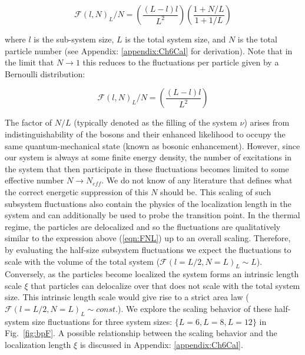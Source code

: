 \begin{equation}
\label{eqn:FNL}
\mathcal{F}(l,N)_L/N = \left ( \frac{\left ( L-l \right ) l }{L^2} \right ) \left ( \frac{ 1+N/L }{ 1+1/L } \right )
\end{equation}

where $l$ is the sub-system size, $L$ is the total system size, and $N$ is the total particle number (see Appendix: \ref{appendix:Ch6Cal} for derivation). Note that in the limit that $N\rightarrow 1$ this reduces to the fluctuations per particle given by a Bernoulli distribution:

\[
\mathcal{F}(l,N)_L/N = \left ( \frac{\left ( L-l \right ) l }{L^2} \right )
\]

 The factor of $N/L$ (typically denoted as the filling of the system $\nu$) arises from indistinguishability of the bosons and their enhanced likelihood to occupy the same quantum-mechanical state (known as bosonic enhancement).  However, since our system is always at some finite energy density, the number of excitations in the system that then participate in these fluctuations becomes limited to some effective number $N\rightarrow N_{eff}$. We do not know of any literature that defines what the correct energetic suppression of this $N$ should be. This scaling of such subsystem fluctuations also contain the physics of the localization length in the system and can additionally be used to probe the transition point. In the thermal regime, the particles are delocalized and so the fluctuations are qualitatively similar to the expression above (\ref{eqn:FNL}) up to an overall scaling. Therefore, by evaluating the half-size subsystem fluctuations we expect the fluctuations to scale with the volume of the total system ($\mathcal{F}(l=L/2,N=L)_L \sim L$). Conversely, as the particles become localized the system forms an intrinsic length scale $\xi$ that particles can delocalize over that does not scale with the total system size. This intrinsic length scale would give rise to a strict area law ($\mathcal{F}(l=L/2,N=L)_L \sim const.$)\cite{Singh2016}. We explore the scaling behavior of these half-system size fluctuations for three system sizes: $\{ L=6, L=8, L=12\}$ in Fig.~\ref{fig:bpF}. A possible relationship between the scaling behavior and the localization length $\xi$ is discussed in Appendix: \ref{appendix:Ch6Cal}.

